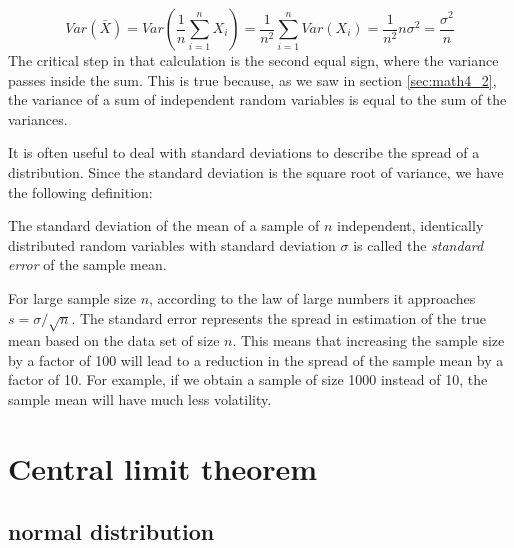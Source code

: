 \documentclass[
  letterpaper,
  DIV=11,
  numbers=noendperiod]{scrreprt}
\begin{document}
\[ Var(\bar X) = Var\left(\frac{1}{n} \sum_{i=1}^{n} X_i\right)  = 
 \frac{1}{n^2} \sum_{i=1}^{n}Var(X_i) =  \frac{1}{n^2} n \sigma^2 = \frac{\sigma^2}{n}\]
The critical step in that calculation is the second equal sign, where
the variance passes inside the sum. This is true because, as we saw in
section \ref{sec:math4_2}, the variance of a sum of independent random
variables is equal to the sum of the variances.

It is often useful to deal with standard deviations to describe the
spread of a distribution. Since the standard deviation is the square
root of variance, we have the following definition:

\begin{tcolorbox}[enhanced jigsaw, coltitle=black, arc=.35mm, opacitybacktitle=0.6, breakable, bottomtitle=1mm, toptitle=1mm, titlerule=0mm, colback=white, leftrule=.75mm, rightrule=.15mm, colframe=quarto-callout-note-color-frame, colbacktitle=quarto-callout-note-color!10!white, opacityback=0, title=\textcolor{quarto-callout-note-color}{\faInfo}\hspace{0.5em}{Definition}, left=2mm, toprule=.15mm, bottomrule=.15mm]

The standard deviation of the mean of a sample of \(n\) independent,
identically distributed random variables with standard deviation
\(\sigma\) is called the \emph{standard error} of the sample mean.

\end{tcolorbox}

For large sample size \(n\), according to the law of large numbers it
approaches \(s= \sigma/\sqrt{n}\). The standard error represents the
spread in estimation of the true mean based on the data set of size
\(n\). This means that increasing the sample size by a factor of 100
will lead to a reduction in the spread of the sample mean by a factor of
10. For example, if we obtain a sample of size 1000 instead of 10, the
sample mean will have much less volatility.

\hypertarget{central-limit-theorem}{%
\section{Central limit theorem}\label{central-limit-theorem}}

\hypertarget{normal-distribution}{%
\subsection{normal distribution}\label{normal-distribution}}
\end{document}
